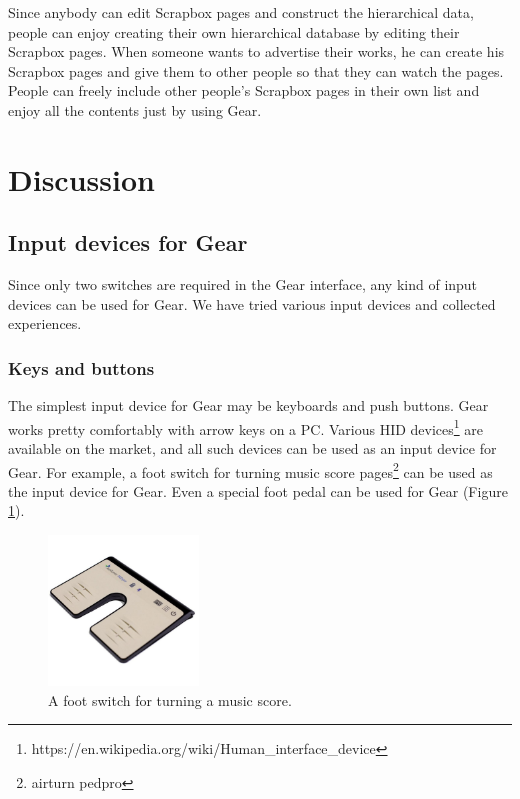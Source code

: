 \documentclass[conference]{IEEEtran}
\def\SB{Scrapbox}
\begin{document}
Since anybody can edit {\SB} pages and construct the hierarchical data,
people can enjoy creating their own hierarchical database by editing their {\SB} pages.
When someone wants to advertise their works,
he can create his {\SB} pages
and give them to other people so that they can watch the pages.
People can freely include other people's {\SB} pages in their own list
and enjoy all the contents just by using Gear.

\section{Discussion}

\subsection{Input devices for Gear}

Since only two switches are required in the Gear interface,
any kind of input devices can be used for Gear.
We have tried various input devices and collected experiences.

\subsubsection{Keys and buttons}

The simplest input device for Gear may be keyboards and push buttons.
Gear works pretty comfortably with arrow keys on a PC.
Various HID devices\footnote{
  https://en.wikipedia.org/wiki/Human\_interface\_device
} are available on the market, and
all such devices can be used as an input device for Gear.
For example, a foot switch for turning music score pages\footnote{
  airturn pedpro
} can be used as the input device for Gear.
Even a special foot pedal can be used for Gear (Figure \ref{footswitch}).

\begin{figure}[H]
\centerline{\includegraphics[width=40mm,bb=0 0 900 900]{figures/8d4f811f5a0c393acaff304102ba963f.jpg}}
\caption{A foot switch for turning a music score.}
\label{footswitch}
\end{figure}
\end{document}
